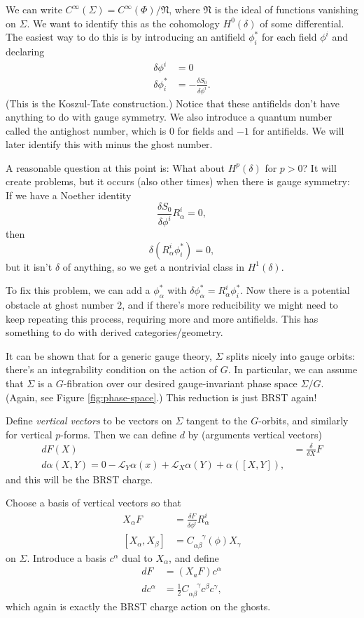 We can write $C^\infty(\Sigma) = C^\infty(\Phi)/\mathfrak{N}$, where $\mathfrak N$ is the ideal of functions vanishing on $\Sigma$.
We want to identify this as the cohomology $H^0(\delta)$ of some differential.
The easiest way to do this is by introducing an antifield $\phi_i^*$ for each field $\phi^i$ and declaring
\begin{align*}
\delta \phi^i &= 0\\
\delta \phi_i^* &= -\frac{\delta S_0}{\delta \phi^i}.
\end{align*}
(This is the Koszul-Tate construction.)
Notice that these antifields don't have anything to do with gauge symmetry.
We also introduce a quantum number  called the antighost number, which is $0$ for fields and $-1$ for antifields.
We will later identify this with minus the ghost number.

A reasonable question at this point is: What about $H^p(\delta)$ for $p > 0$?
It will create problems, but it occurs (also other times) when there is gauge symmetry: If we have a Noether identity
\[
\frac{\delta S_0}{\delta \phi^i} R_\alpha^i = 0,
\]
then
\[
\delta\left(R_\alpha^i \phi_i^* \right) = 0,
\]
but it isn't $\delta$ of anything, so we get a nontrivial class in $H^1(\delta)$.

To fix this problem, we can add a $\phi_\alpha^*$ with $\delta \phi_\alpha^* = R_\alpha^i \phi_i^*$.
Now there is a potential obstacle at ghost number $2$, and if there's more reducibility we might need to keep repeating this process, requiring more and more antifields.
This has something to do with derived categories/geometry.

It can be shown that for a generic gauge theory, $\Sigma$ splits nicely into gauge orbits: there's an integrability condition on the action of $G$.
In particular, we can assume that $\Sigma$ is a $G$-fibration over our desired gauge-invariant phase space $\Sigma/G$.
(Again, see Figure \ref{fig:phase-space}.)
This reduction is just BRST again!

Define \emph{vertical vectors} to be vectors on $\Sigma$ tangent to the $G$-orbits, and similarly for vertical $p$-forms.
Then we can define $d$ by (arguments vertical vectors)
\begin{align*}
dF(X) &= \frac{\delta}{\delta X}F\\
d \alpha(X,Y) = 0 - \mathcal{L}_Y \alpha(x) + \mathcal{L}_X \alpha(Y) + \alpha([X,Y]),
\end{align*}
and this will be the BRST charge.

Choose a basis of vertical vectors so that
\begin{align*}
X_\alpha F &= \frac{\delta F}{\delta \phi^i} R_\alpha^i\\
[X_\alpha, X_\beta] &= C_{\alpha \beta}^{\phantom{\alpha \beta} \gamma}(\phi) X_\gamma
\end{align*}
on $\Sigma$.
Introduce a basis $c^\alpha$ dual to $X_\alpha$, and define
\begin{align*}
dF &= (X_a F)c^\alpha\\
dc^\alpha &= \frac{1}{2} C_{\alpha \beta}^{\phantom{\alpha \beta} \gamma} c^\beta c^\gamma,
\end{align*}
which again is exactly the BRST charge action on the ghosts.

